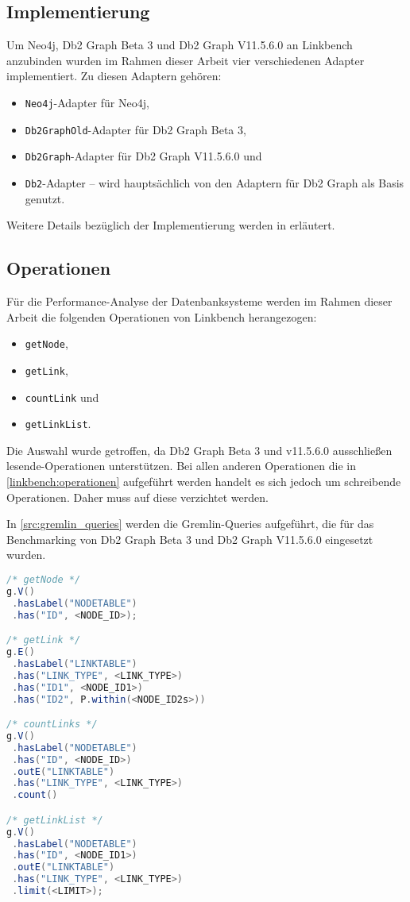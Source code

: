 \subsection{Implementierung}
Um Neo4j, Db2 Graph Beta 3 und Db2 Graph V11.5.6.0 an Linkbench anzubinden wurden im Rahmen dieser Arbeit vier verschiedenen Adapter implementiert. Zu diesen Adaptern gehören:
\begin{itemize}
    \item \texttt{Neo4j}-Adapter für Neo4j,
    \item \texttt{Db2GraphOld}-Adapter für Db2 Graph Beta 3, 
    \item \texttt{Db2Graph}-Adapter für Db2 Graph V11.5.6.0 und
    \item \texttt{Db2}-Adapter -- wird hauptsächlich von den Adaptern für Db2 Graph als Basis genutzt.
\end{itemize}
Weitere Details bezüglich der Implementierung werden in  erläutert.

\subsection{Operationen}
Für die Performance-Analyse der Datenbanksysteme werden im Rahmen dieser Arbeit die folgenden Operationen von Linkbench herangezogen:
\begin{itemize}
    \item \texttt{getNode},
    \item \texttt{getLink},
    \item \texttt{countLink} und
    \item \texttt{getLinkList}.
\end{itemize}
Die Auswahl wurde getroffen, da Db2 Graph Beta 3 und v11.5.6.0 ausschließen lesende-Operationen unterstützen. Bei allen anderen Operationen die in \autoref{linkbench:operationen} aufgeführt werden handelt es sich jedoch um schreibende Operationen. Daher muss auf diese verzichtet werden. 

In \autoref{src:gremlin_queries} werden die Gremlin-Queries aufgeführt, die für das Benchmarking von Db2 Graph Beta 3 und Db2 Graph V11.5.6.0 eingesetzt wurden. 
\begin{lstlisting}[label=src:gremlin_queries,caption={ Gremlin Queries (regulär)},language=Java]
/* getNode */
g.V()
 .hasLabel("NODETABLE")
 .has("ID", <NODE_ID>);

/* getLink */
g.E()
 .hasLabel("LINKTABLE")
 .has("LINK_TYPE", <LINK_TYPE>)
 .has("ID1", <NODE_ID1>)
 .has("ID2", P.within(<NODE_ID2s>))

/* countLinks */
g.V()
 .hasLabel("NODETABLE")
 .has("ID", <NODE_ID>)
 .outE("LINKTABLE")
 .has("LINK_TYPE", <LINK_TYPE>)
 .count()

/* getLinkList */
g.V()
 .hasLabel("NODETABLE")
 .has("ID", <NODE_ID1>)
 .outE("LINKTABLE")
 .has("LINK_TYPE", <LINK_TYPE>)
 .limit(<LIMIT>);
\end{lstlisting}

